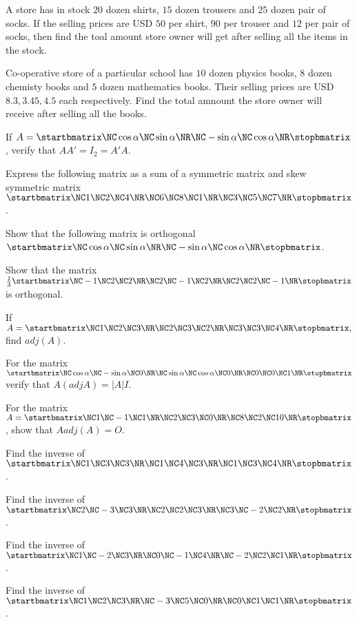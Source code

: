 \item A store has in stock $20$ dozen shirts, $15$ dozen trousers and $25$ dozen pair of socks. If the selling prices are USD $50$
  per shirt, $90$ per trouser and $12$ per pair of socks, then find the toal amount store owner will get after selling all the
  items in the stock.
\item Co-operative store of a particular school has $10$ dozen physics books, $8$ dozen chemisty books and $5$ dozen mathematics
  books. Their selling prices are USD $8.3, 3.45, 4.5$ each respectively. Find the total amnount the store owner will receive after
    selling all the books.
\item If $A = \startbmatrix\NC \cos\alpha \NC \sin\alpha \NR\NC -\sin\alpha \NC \cos \alpha\NR\stopbmatrix$, verify that $AA' = I_2 = A'A$.
\item Express the following matrix as a sum of a symmetric matrix and skew symmetric matrix $\startbmatrix\NC 1 \NC 2 \NC 4 \NR\NC 6 \NC 8 \NC 1
  \NR\NC 3 \NC 5 \NC 7\NR\stopbmatrix$.
\item Show that the following matrix is orthogonal $\startbmatrix\NC  \cos\alpha \NC \sin\alpha \NR\NC -\sin\alpha \NC \cos\alpha\NR\stopbmatrix$.
\item Show that the matrix $\frac{1}{3}\startbmatrix\NC -1 \NC 2 \NC 2 \NR\NC 2 \NC -1 \NC 2 \NR\NC 2 \NC 2 \NC -1\NR\stopbmatrix$ is orthogonal.
\item If $A = \startbmatrix\NC 1 \NC 2 \NC 3 \NR\NC 2 \NC 3 \NC 2 \NR\NC 3 \NC 3 \NC 4\NR\stopbmatrix,$ find $adj(A)$.
\item For the matrix $\startbmatrix\NC \cos\alpha \NC -\sin\alpha \NC 0 \NR\NC\sin\alpha \NC \cos\alpha \NC 0 \NR\NC 0 \NC 0 \NC 1\NR\stopbmatrix$ verify
  that $A(adj A) = |A|I$.
\item For the matrix $A = \startbmatrix\NC 1 \NC -1 \NC 1 \NR\NC 2 \NC 3 \NC 0 \NR\NC 8 \NC 2 \NC 10\NR\stopbmatrix$, show that $A adj(A) = O$.
\item Find the inverse of $\startbmatrix\NC 1 \NC 3 \NC 3 \NR\NC 1 \NC 4 \NC 3 \NR\NC 1 \NC 3 \NC 4\NR\stopbmatrix$.
\item Find the inverse of $\startbmatrix\NC 2 \NC -3 \NC 3 \NR\NC 2 \NC 2 \NC 3 \NR\NC 3 \NC -2 \NC 2\NR\stopbmatrix$.
\item Find the inverse of $\startbmatrix\NC 1 \NC -2 \NC 3 \NR\NC 0 \NC -1 \NC 4 \NR\NC -2 \NC 2 \NC 1\NR\stopbmatrix$.
\item Find the inverse of $\startbmatrix\NC 1 \NC 2 \NC 3 \NR\NC -3 \NC 5 \NC 0 \NR\NC 0 \NC 1 \NC 1\NR\stopbmatrix$.
